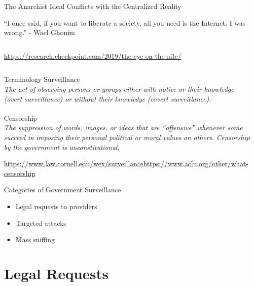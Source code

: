\documentclass[nobackground,dvipsnames,table]{beamer}
\begin{document}
\begin{frame}{The Anarchist Ideal Conflicts with the Centralized Reality}
\end{frame}

\begin{frame}{“I once said, if you want to liberate a society, all you need is the Internet. I was wrong.” - Wael Ghonim}
    \begin{columns}
            \href{Check Point Research}{https://research.checkpoint.com/2019/the-eye-on-the-nile/}
    \end{columns}
\end{frame}

\begin{frame}{Terminology}%
    \Large{Surveillance}\\
    \textit{The act of observing persons or groups either with notice or their knowledge (overt surveillance) or without their knowledge (covert surveillance).}\\~\\
    
    \Large{Censorship}\\
    \textit{The suppression of words, images, or ideas that are “offensive” whenever some succeed in imposing their personal political or moral values on others. Censorship by the government is unconstitutional.}

    \scriptsize
    \href{Cornell Law, }{https://www.law.cornell.edu/wex/surveillance}\href{ACLU}{https://www.aclu.org/other/what-censorship}
\end{frame}

\begin{frame}{Categories of Government Surveillance}
    \begin{itemize}
        \item Legal requests to providers
        \item Targeted attacks
        \item Mass sniffing
    \end{itemize}
\end{frame}

\section{Legal Requests}
\end{document}
